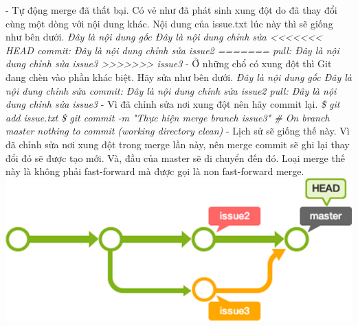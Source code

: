 \documentclass[12pt,a4paper]{report}
\begin{document}
- Tự động merge đã thất bại. Có vẻ như đã phát sinh xung đột do đã thay đổi cùng một dòng với nội dung khác. Nội dung của issue.txt lúc này thì sẽ giống như bên dưới.	\vskip 0.4cm
{\it \hspace{1cm}Đây là nội dung gốc	\vskip 0.1cm
\hspace{1cm}Đây là nội dung chỉnh sửa	\vskip 0.1cm
\hspace{1cm}<<<<<<< HEAD	\vskip 0.1cm
\hspace{1cm}commit: Đây là nội dung chỉnh sửa issue2	\vskip 0.1cm
\hspace{1cm}=======	\vskip 0.1cm
\hspace{1cm}pull: Đây là nội dung chỉnh sửa issue3	\vskip 0.1cm
\hspace{1cm}>>>>>>> issue3}	\vskip 0.4cm
- Ở những chổ có xung đột thì Git đang chèn vào phần khác biệt. Hãy sửa như bên dưới.	\vskip 0.4cm
{\it \hspace{1cm}Đây là nội dung gốc	\vskip 0.1cm
\hspace{1cm}Đây là nội dung chỉnh sửa	\vskip 0.1cm
\hspace{1cm}commit: Đây là nội dung chỉnh sửa issue2	\vskip 0.1cm
\hspace{1cm}pull: Đây là nội dung chỉnh sửa issue3}	\vskip 0.4cm
- Vì đã chỉnh sửa nơi xung đột nên hãy commit lại.	\vskip 0.4cm
{\it \hspace{1cm}\$ git add issue.txt	\vskip 0.1cm
\hspace{1cm}\$ git commit -m "Thực hiện merge branch issue3"	\vskip 0.1cm \hspace{1cm}
\hspace{1cm}\# On branch master	\vskip 0.1cm
\hspace{1cm}nothing to commit (working directory clean)}	\vskip 0.4cm
- Lịch sử sẽ giống thế này. Vì đã chỉnh sửa nơi xung đột trong merge lần này, nên merge commit sẽ ghi lại thay đổi đó sẽ được tạo mới. Và, đầu của master sẽ di chuyển đến đó. Loại merge thế này là không phải fast-forward mà được gọi là non fast-forward merge.
	\vskip 0.4cm
	\includegraphics[width=0.8\linewidth]{screenshot064}
\end{document}
